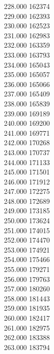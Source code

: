 { 228.000	162374 \\
 229.000	162393 \\
 230.000	162523 \\
 231.000	162983 \\
 232.000	163359 \\
 233.000	163793 \\
 234.000	165043 \\
 235.000	165057 \\
 236.000	165066 \\
 237.000	165409 \\
 238.000	165839 \\
 239.000	169189 \\
 240.000	169200 \\
 241.000	169771 \\
 242.000	170268 \\
 243.000	170737 \\
 244.000	171133 \\
 245.000	171501 \\
 246.000	171912 \\
 247.000	172275 \\
 248.000	172689 \\
 249.000	173185 \\
 250.000	173624 \\
 251.000	174015 \\
 252.000	174470 \\
 253.000	174921 \\
 254.000	175466 \\
 255.000	179271 \\
 256.000	179763 \\
 257.000	180260 \\
 258.000	181443 \\
 259.000	181935 \\
 260.000	182417 \\
 261.000	182975 \\
 262.000	183388 \\
 263.000	183794 \\
}
